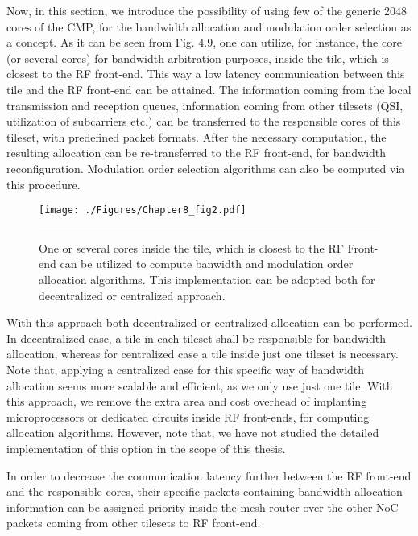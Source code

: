 Now, in this section, we introduce the possibility of using few of the generic 2048 cores of the CMP, for the bandwidth allocation and modulation order selection as a concept. As it can be seen from Fig. 4.9, one can utilize, for instance, the core (or several cores) for bandwidth arbitration purposes, inside the tile, which is closest to the RF front-end. This way a low latency communication between this tile and the RF front-end can be attained. The information coming from the local transmission and reception queues, information coming from other tilesets (QSI, utilization of subcarriers etc.) can be transferred to the responsible cores of this tileset, with predefined packet formats. After the necessary computation, the resulting allocation can be re-transferred to the RF front-end, for bandwidth reconfiguration. Modulation order selection algorithms can also be computed via this procedure. 

\begin{figure}[htbp]
  \centering
    \texttt{[image: ./Figures/Chapter8\_fig2.pdf]}
    \rule{35em}{0.5pt}
  \caption[One or several cores inside the tile, which is closest to the RF Front-end can be utilized to compute banwidth and modulation order allocation algorithms. This implementation can be adopted both for decentralized or centralized approach.]{One or several cores inside the tile, which is closest to the RF Front-end can be utilized to compute banwidth and modulation order allocation algorithms. This implementation can be adopted both for decentralized or centralized approach.} 
  \label{fig:Electron}
\end{figure}

With this approach both decentralized or centralized allocation can be performed. In decentralized case, a tile in each tileset shall be responsible for bandwidth allocation, whereas for centralized case a tile inside just one tileset is necessary. Note that, applying a centralized case for this specific way of bandwidth allocation seems more scalable and efficient, as we only use just one tile. With this approach, we remove the extra area and cost overhead of implanting microprocessors or dedicated circuits inside RF front-ends, for computing allocation algorithms. However, note that, we have not studied the detailed implementation of this option in the scope of this thesis. 

In order to decrease the communication latency further between the RF front-end and the responsible cores, their specific packets containing bandwidth allocation information can be assigned priority inside the mesh router over the other NoC packets coming from other tilesets to RF front-end. 

